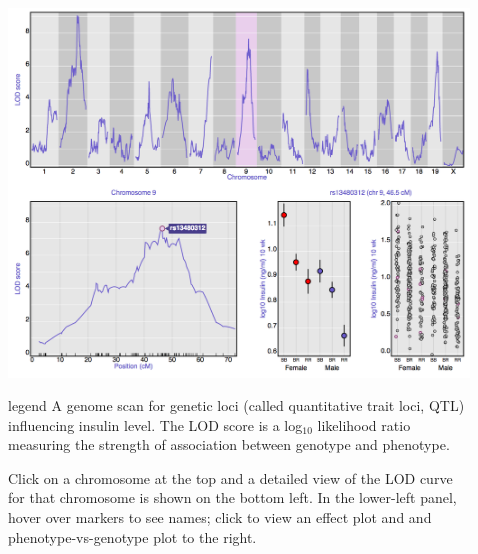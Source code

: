 \documentclass[final,plain]{beamer}
\newlength{\sepwid}
\newlength{\onecolwid}
\newlength{\twocolwid}
\begin{document}
\begin{frame}[t]
\begin{columns}[t]
\begin{column}{\twocolwid}
\begin{columns}[t]
\begin{column}{\onecolwid}
        \centerline{\href{http://www.biostat.wisc.edu/~kbroman/posters/ENAR2014/1b}{\includegraphics[width=\onecolwid]{Figs/1b.png}}}

      \vspace{10mm} %

        \begin{beamercolorbox}[sep=1em, wd=\onecolwid]{legend} \rmfamily
           A genome scan for genetic loci (called quantitative trait
           loci, QTL) influencing insulin level. The LOD score is a
           log$_{10}$ likelihood ratio measuring the strength of
           association between genotype and phenotype.

           \vspace{12pt}

           Click on a chromosome at the top and a detailed view of the
           LOD curve for that chromosome is shown on the bottom left.
           In the lower-left panel, hover over markers to see names;
           click to view an effect plot and and phenotype-vs-genotype
           plot to the right.
        \end{beamercolorbox}


      \end{column}

      \begin{column}{\sepwid} \end{column} %

      \begin{column}{\onecolwid}


\end{column}
\end{columns}
\end{column}
\end{columns}
\end{frame}
\end{document}
